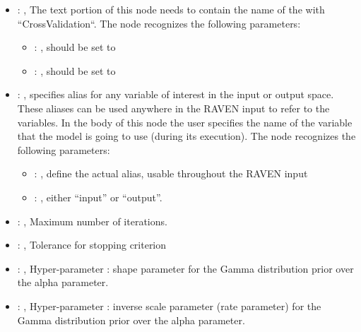 \begin{itemize}
    \item {}: , 
      The text portion of this node needs to contain the name of the  with
               ``CrossValidation``.
      The  node recognizes the following parameters:
        \begin{itemize}
          \item {}: , 
            should be set to 
          \item {}: , 
            should be set to 
      \end{itemize}

    \item {}: , 
      specifies alias for         any variable of interest in the input or output space. These
      aliases can be used anywhere in the RAVEN input to         refer to the variables. In the body
      of this node the user specifies the name of the variable that the model is going to use
      (during its execution).
      The  node recognizes the following parameters:
        \begin{itemize}
          \item {}: , 
            define the actual alias, usable throughout the RAVEN input
          \item {}: , 
            either ``input'' or ``output''.
      \end{itemize}

    \item {}: , 
      Maximum number of iterations.

    \item {}: , 
      Tolerance for stopping criterion

    \item {}: , 
      Hyper-parameter : shape parameter for the Gamma
      distribution prior over the alpha parameter.

    \item {}: , 
      Hyper-parameter : inverse scale parameter (rate parameter)
      for the Gamma distribution prior over the alpha parameter.


\end{itemize}

